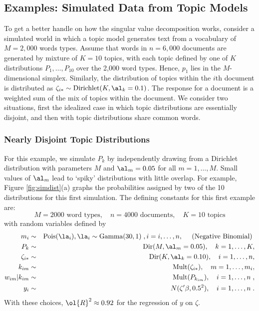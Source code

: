 \documentclass[10pt]{article}
\begin{document}
\subsection{Examples: Simulated Data from Topic Models}

 To get a better handle on how the singular value decomposition works, consider
 a simulated world in which a topic model generates text from a vocabulary of $M
 = 2,000$ words types.  Assume that words in $n = 6,000$ documents are generated by mixture of $K=10$ topics, with each topic defined by  one of $K$ distributions $P_1,\ldots, P_{10}$ over the 2,000 word types.  
 Hence, $p_1$ lies in the $M$-dimensional
 simplex.     Similarly, the distribution of topics within the $i$th document is distributed as $\zeta_{i*} \sim \mbox{Dirichlet}(K, \al_k=0.1)$.  The response for a document is a weighted sum of the mix of topics within the document.  We consider two situations, first the idealized case in which topic distributions are essentially disjoint, and then with topic distributions share common words.
 
 \subsubsection{Nearly Disjoint Topic Distributions} %
 
  
 For this example, we simulate $P_k$ by independently drawing from a Dirichlet distribution with parameters $M$ and $\al_m = 0.05$ for all $m = 1,\ldots,M$.  Small values of $\al_m$ lead to `spiky' distributions with little overlap.  For example, Figure \ref{fig:simdist}(a) graphs the probabilities assigned by two of the 10 distributions for this first simulation.  The defining constants for this first example are:
 \begin{displaymath}
    M = 2000 \mbox{ word types}, \quad
    n = 4000 \mbox{ documents},  \quad
    K = 10 \mbox{ topics}   
 \end{displaymath}
 with random variables defined by
 \begin{eqnarray*}
    m_i           &\sim& \mbox{Pois}(\la_i), \la_i \sim \mbox{Gamma}(30,1)\;,
                     i = i,\ldots, n, \quad \mbox{ (Negative Binomial) }       \cr
    P_k                &\sim& \mbox{Dir}(M, \al_m=0.05), \quad k=1,\ldots,K,  \cr
    \zeta_{i*}        &\sim& \mbox{Dir}(K, \al_k=0.10),\quad i=1,\ldots,n,  \cr
    k_{im}             &\sim& \mbox{Mult}(\zeta_{i*}), \quad m=1,\ldots,m_i,    \cr 
    w_{im}|k_{im} &\sim& \mbox{Mult}(P_{k_{im}}), \quad i=1,\ldots,n \;, \cr
    y_i                  &\sim& N(\zeta'\beta, 0.5^2), \quad i = 1,\ldots,n \;.
 \end{eqnarray*}
 With these choices, $\ol{R}^2 \approx 0.92$ for the regression of $y$ on $\zeta$.
\end{document}
